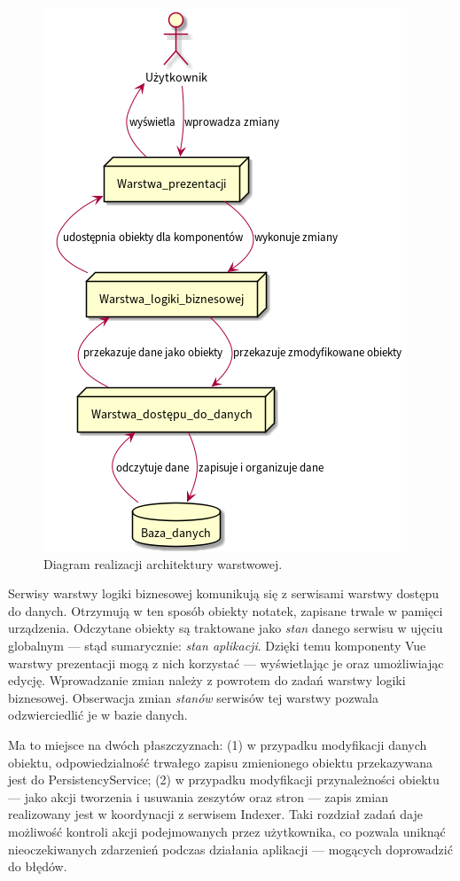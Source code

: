 \begin{figure}[H]
	\begin{center}
		\includegraphics[scale=0.6]{media/Architecture.png}
	\end{center}
	\caption{Diagram realizacji architektury warstwowej.}
	\label{rys:architecture}
\end{figure}

Serwisy warstwy logiki biznesowej komunikują się z serwisami warstwy dostępu do danych.
Otrzymują w ten sposób obiekty notatek, zapisane trwale w pamięci urządzenia.
Odczytane obiekty są traktowane jako \textit{stan} danego serwisu w ujęciu globalnym — stąd sumarycznie: \textit{stan aplikacji}.
Dzięki temu komponenty Vue warstwy prezentacji mogą z nich korzystać — wyświetlając je oraz umożliwiając edycję.
Wprowadzanie zmian należy z powrotem do zadań warstwy logiki biznesowej. Obserwacja zmian \textit{stanów} serwisów tej warstwy
pozwala odzwierciedlić je w bazie danych.

Ma to miejsce na dwóch płaszczyznach: (1) w przypadku modyfikacji danych obiektu,
odpowiedzialność trwałego zapisu zmienionego obiektu przekazywana jest do PersistencyService;
(2) w przypadku modyfikacji przynależności obiektu — jako akcji
tworzenia i usuwania zeszytów oraz stron — zapis zmian realizowany jest w koordynacji z serwisem Indexer.
Taki rozdział zadań daje możliwość kontroli akcji podejmowanych przez użytkownika, co pozwala uniknąć nieoczekiwanych
zdarzenień podczas działania aplikacji — mogących doprowadzić do błędów.

